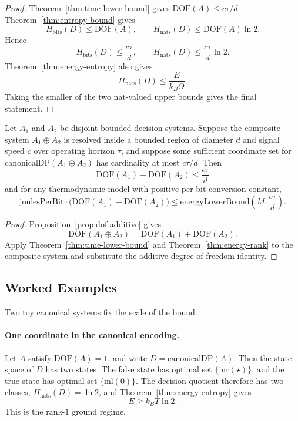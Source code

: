 \begin{proof}
Theorem~\ref{thm:time-lower-bound} gives $\mathrm{DOF}(A) \le c\tau/d$. Theorem~\ref{thm:entropy-bound} gives
\[
H_{\mathrm{bits}}(D) \le \mathrm{DOF}(A),
\qquad
H_{\mathrm{nats}}(D) \le \mathrm{DOF}(A)\ln 2.
\]
Hence
\[
H_{\mathrm{bits}}(D) \le \frac{c\tau}{d},
\qquad
H_{\mathrm{nats}}(D) \le \frac{c\tau}{d}\ln 2.
\]
Theorem~\ref{thm:energy-entropy} also gives
\[
H_{\mathrm{nats}}(D) \le \frac{E}{k_B \Theta}.
\]
Taking the smaller of the two nat-valued upper bounds gives the final statement.
\end{proof}

\begin{corollary}\label{cor:composition-budget-law}
Let $A_1$ and $A_2$ be disjoint bounded decision systems. Suppose the composite system $A_1 \oplus A_2$ is resolved inside a bounded region of diameter $d$ and signal speed $c$ over operating horizon $\tau$, and suppose some sufficient coordinate set for $\mathrm{canonicalDP}(A_1 \oplus A_2)$ has cardinality at most $c\tau/d$. Then
\[
\mathrm{DOF}(A_1)+\mathrm{DOF}(A_2) \le \frac{c\tau}{d}
\]
and for any thermodynamic model with positive per-bit conversion constant,
\[
\mathrm{joulesPerBit}\cdot\bigl(\mathrm{DOF}(A_1)+\mathrm{DOF}(A_2)\bigr)
\le
\mathrm{energyLowerBound}\!\left(M,\frac{c\tau}{d}\right).
\]
\end{corollary}

\begin{proof}
Proposition~\ref{prop:dof-additive} gives
\[
\mathrm{DOF}(A_1 \oplus A_2) = \mathrm{DOF}(A_1)+\mathrm{DOF}(A_2).
\]
Apply Theorem~\ref{thm:time-lower-bound} and Theorem~\ref{thm:energy-rank} to the composite system and substitute the additive degree-of-freedom identity.
\end{proof}

\subsection{Worked Examples}

Two toy canonical systems fix the scale of the bound.

\paragraph{One coordinate in the canonical encoding.}
Let $A$ satisfy $\mathrm{DOF}(A)=1$, and write $D=\mathrm{canonicalDP}(A)$. Then the state space of $D$ has two states. The false state has optimal set $\{\mathrm{inr}(\star)\}$, and the true state has optimal set $\{\mathrm{inl}(0)\}$. The decision quotient therefore has two classes, $H_{\mathrm{nats}}(D)=\ln 2$, and Theorem~\ref{thm:energy-entropy} gives
\[
E \ge k_B T \ln 2.
\]
This is the rank-$1$ ground regime.

